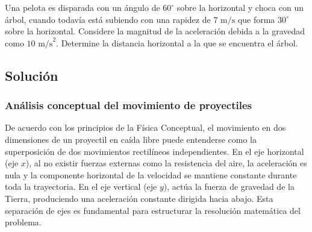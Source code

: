 \documentclass[12pt, a4paper]{article}
\begin{document}
Una pelota es disparada con un ángulo de $60^{\circ}$ sobre la horizontal y choca con un árbol, cuando todavía está subiendo con una rapidez de $7\text{ m/s}$ que forma $30^{\circ}$ sobre la horizontal. Considere la magnitud de la aceleración debida a la gravedad como $10\text{ m/s}^{2}$. Determine la distancia horizontal a la que se encuentra el árbol.

\begin{center}
\end{center}

\subsection*{Solución}

\subsubsection*{Análisis conceptual del movimiento de proyectiles}

De acuerdo con los principios de la Física Conceptual, el movimiento en dos dimensiones de un proyectil en caída libre puede entenderse como la superposición de dos movimientos rectilíneos independientes. En el eje horizontal (eje $x$), al no existir fuerzas externas como la resistencia del aire, la aceleración es nula y la componente horizontal de la velocidad se mantiene constante durante toda la trayectoria. En el eje vertical (eje $y$), actúa la fuerza de gravedad de la Tierra, produciendo una aceleración constante dirigida hacia abajo. Esta separación de ejes es fundamental para estructurar la resolución matemática del problema.
\end{document}
